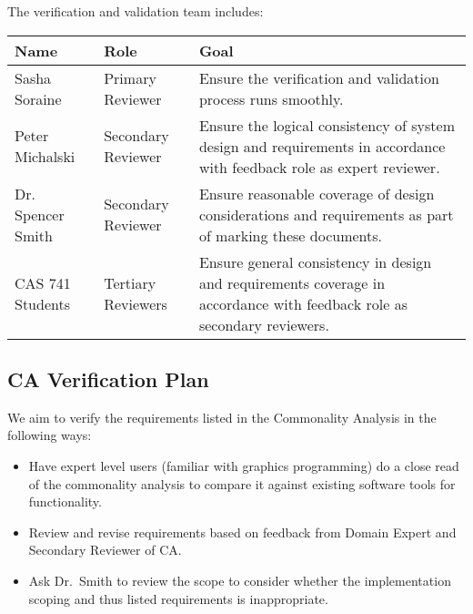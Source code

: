 \documentclass[12pt, titlepage]{article}
\begin{document}
The verification and validation team includes:

\begin{table}[h]
	\begin{tabular}{|l|l|p{8cm}|}
		\hline
		\textbf{Name} & \textbf{Role} & \textbf{Goal} \\
		\hline
		Sasha Soraine & Primary Reviewer& Ensure the verification and 
		validation 
		process runs smoothly.\\
		Peter Michalski & Secondary Reviewer& Ensure the logical consistency of 
		system 
		design and requirements in accordance with feedback role as expert 
		reviewer. \\
		Dr. Spencer Smith & Secondary Reviewer& Ensure reasonable coverage of 
		design 
		considerations and requirements as part of marking these documents. \\
		CAS 741 Students & Tertiary Reviewers& Ensure general consistency in 
		design and 
		requirements coverage in accordance with feedback role as secondary 
		reviewers.\\
		\hline
	\end{tabular}
\end{table}


\pagebreak
\subsection{CA Verification Plan}

We aim to verify the requirements listed in the Commonality Analysis in the 
following ways:

\begin{itemize}
	\item Have expert level users (familiar with graphics programming) do a 
	close read of the commonality analysis to compare it against existing 
	software tools for functionality. 
	\item Review and revise requirements based on feedback from Domain Expert 
	and Secondary Reviewer of CA.
      \item Ask Dr.\ Smith  to review the scope to consider whether
        the implementation scoping and thus listed requirements is
        inappropriate.
\end{itemize}
\end{document}
